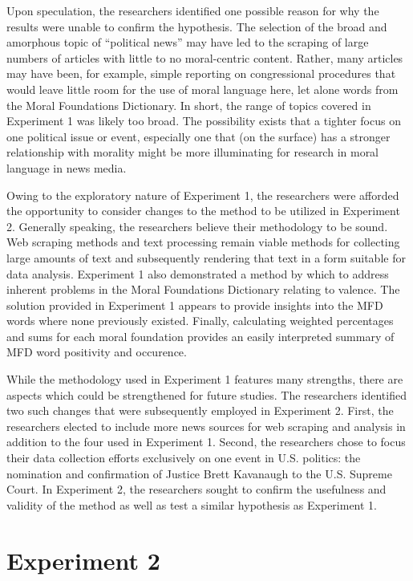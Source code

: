 \documentclass[english,,man]{apa6}
\begin{document}
Upon speculation, the researchers identified one possible reason for why the results were unable to confirm the hypothesis. The selection of the broad and amorphous topic of \enquote{political news} may have led to the scraping of large numbers of articles with little to no moral-centric content. Rather, many articles may have been, for example, simple reporting on congressional procedures that would leave little room for the use of moral language here, let alone words from the Moral Foundations Dictionary. In short, the range of topics covered in Experiment 1 was likely too broad. The possibility exists that a tighter focus on one political issue or event, especially one that (on the surface) has a stronger relationship with morality might be more illuminating for research in moral language in news media.

Owing to the exploratory nature of Experiment 1, the researchers were afforded the opportunity to consider changes to the method to be utilized in Experiment 2. Generally speaking, the researchers believe their methodology to be sound. Web scraping methods and text processing remain viable methods for collecting large amounts of text and subsequently rendering that text in a form suitable for data analysis. Experiment 1 also demonstrated a method by which to address inherent problems in the Moral Foundations Dictionary relating to valence. The solution provided in Experiment 1 appears to provide insights into the MFD words where none previously existed. Finally, calculating weighted percentages and sums for each moral foundation provides an easily interpreted summary of MFD word positivity and occurence.

While the methodology used in Experiment 1 features many strengths, there are aspects which could be strengthened for future studies. The researchers identified two such changes that were subsequently employed in Experiment 2. First, the researchers elected to include more news sources for web scraping and analysis in addition to the four used in Experiment 1. Second, the researchers chose to focus their data collection efforts exclusively on one event in U.S. politics: the nomination and confirmation of Justice Brett Kavanaugh to the U.S. Supreme Court. In Experiment 2, the researchers sought to confirm the usefulness and validity of the method as well as test a similar hypothesis as Experiment 1.

\hypertarget{experiment-2}{%
\section{Experiment 2}\label{experiment-2}}
\end{document}
